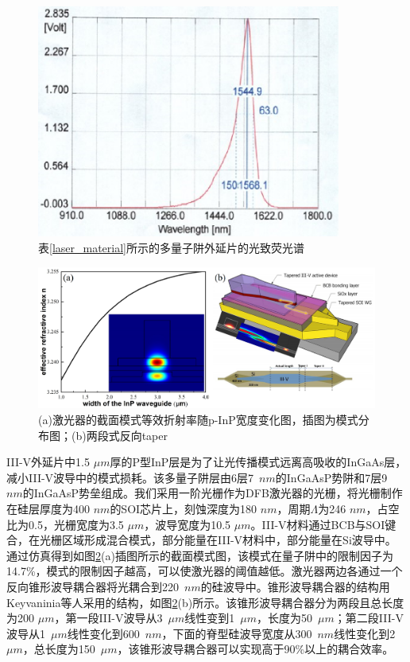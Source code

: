 \begin{figure}[htb]
	\centering
	\includegraphics[width=10cm]{./Pictures/laser_PL.png}
	\captionsetup{justification=centering}
	\caption{表\ref{laser_material}所示的多量子阱外延片的光致荧光谱}
	\label{laser_PL}
\end{figure}

\begin{figure}[htb]
	\centering
	\includegraphics[width=14cm]{./Pictures/laser_modeandtaper.jpg}
	\captionsetup{justification=centering}
	\caption{(a)激光器的截面模式等效折射率随p-InP宽度变化图，插图为模式分布图；(b)两段式反向taper\cite{keyvaninia2013heterogeneously}}
	\label{laser_modeandtaper}
\end{figure}

III-V外延片中1.5 $\mu m$厚的P型InP层是为了让光传播模式远离高吸收的InGaAs层，减小III-V波导中的模式损耗。该多量子阱层由6层7~$nm$的InGaAsP势阱和7层9~$nm$的InGaAsP势垒组成。我们采用一阶光栅作为DFB激光器的光栅，将光栅制作在硅层厚度为400 $nm$的SOI芯片上，刻蚀深度为180 $nm$，周期$\Lambda$为246 $nm$，占空比为0.5，光栅宽度为3.5 $\mu m$，波导宽度为10.5 $\mu m$。III-V材料通过BCB与SOI键合，在光栅区域形成混合模式，部分能量在III-V材料中，部分能量在Si波导中。通过仿真得到如图\ref{laser_modeandtaper}(a)插图所示的截面模式图，该模式在量子阱中的限制因子为14.7\%，模式的限制因子越高，可以使激光器的阈值越低。激光器两边各通过一个反向锥形波导耦合器将光耦合到220~$nm$的硅波导中。锥形波导耦合器的结构用Keyvaninia等人采用的结构\cite{keyvaninia2013heterogeneously}，如图\ref{laser_modeandtaper}(b)所示。该锥形波导耦合器分为两段且总长度为200 $\mu m$，第一段III-V波导从3~$\mu m$线性变到1~$\mu m$，长度为50~$\mu m$；第二段III-V波导从1~$\mu m$线性变化到600~$nm$，下面的脊型硅波导宽度从300~$nm$线性变化到2~$\mu m$，总长度为150~$\mu m$，该锥形波导耦合器可以实现高于90\%以上的耦合效率。

